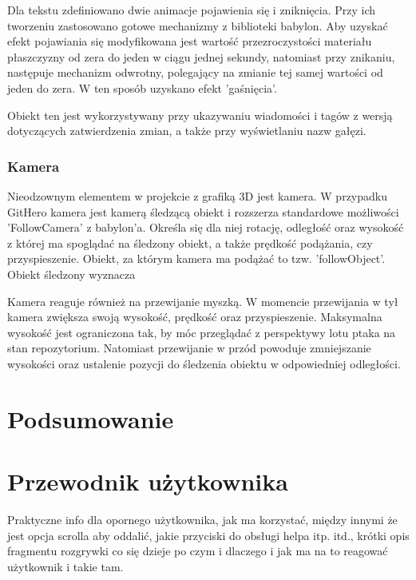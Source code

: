 \documentclass[11pt,a4paper,polish,thesis]{dcsbook}
\begin{document}
	Dla tekstu zdefiniowano dwie animacje pojawienia się i zniknięcia. Przy ich tworzeniu zastosowano gotowe mechanizmy z biblioteki babylon. Aby uzyskać efekt pojawiania się modyfikowana jest wartość przezroczystości materiału płaszczyzny od zera do jeden w ciągu jednej sekundy, natomiast przy znikaniu, następuje mechanizm odwrotny, polegający na zmianie tej samej wartości od jeden do zera. W ten sposób uzyskano efekt 'gaśnięcia'.
	
	Obiekt ten jest wykorzystywany przy ukazywaniu wiadomości i tagów z wersją dotyczących zatwierdzenia zmian, a także przy wyświetlaniu nazw gałęzi.

	

	\subsection{Kamera}
	
	Nieodzownym elementem w projekcie z grafiką 3D jest kamera. W przypadku GitHero kamera jest kamerą śledzącą obiekt i rozszerza standardowe możliwości 'FollowCamera' z babylon'a. Określa się dla niej rotację, odległość oraz wysokość z której ma spoglądać na śledzony obiekt, a także prędkość podążania, czy przyspieszenie. Obiekt, za którym kamera ma podążać to tzw. 'followObject'. Obiekt śledzony wyznacza %
	
	Kamera reaguje również na przewijanie myszką. W momencie przewijania w tył kamera zwiększa swoją wysokość, prędkość oraz przyspieszenie. Maksymalna wysokość jest ograniczona tak, by móc przeglądać z perspektywy lotu ptaka na stan repozytorium. Natomiast przewijanie w przód powoduje zmniejszanie wysokości oraz ustalenie pozycji do śledzenia obiektu w odpowiedniej odległości. 	
	
	\chapter{Podsumowanie}
	
	\appendix
	
	\chapter{Przewodnik użytkownika}
	
	Praktyczne info dla opornego użytkownika, jak ma korzystać, między innymi że jest opcja scrolla aby oddalić, jakie przyciski do obsługi helpa itp. itd., krótki opis fragmentu rozgrywki co się dzieje po czym i dlaczego i jak ma na to reagować użytkownik i takie tam.
	
	\backmatter
	
\end{document}
